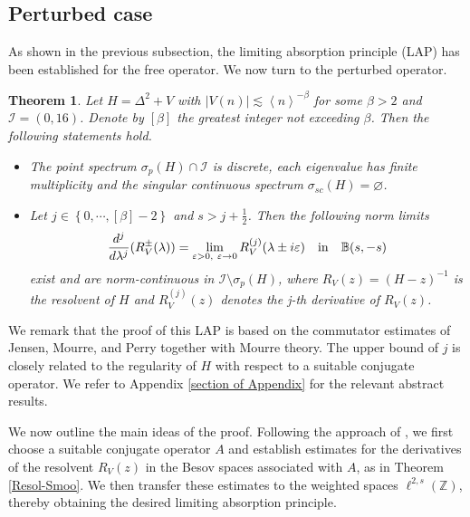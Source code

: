 \documentclass[reqno, 11pt]{amsart}
\newtheorem{theorem}[definition]{Theorem}
\newcommand\Z{\mathbb{Z}}
\newcommand\B{\mathbb{B}}
\newcommand\mcaI{\mathcal{I}}
\numberwithin{equation}{section}
\begin{document}
\subsection{Perturbed case}\label{subsection of asympotic}
As shown in the previous subsection, the limiting absorption principle
(LAP) has been established for the free operator. We now turn to the perturbed operator.
\begin{theorem}\label{LAP-theorem}
{ Let $H=\Delta^2+V$ with $|V(n)|\lesssim \left<n\right>^{-\beta}$ for some $\beta>2$ and $\mcaI=(0,16)$. Denote by $[\beta]$ the greatest integer not exceeding $\beta$. Then the following statements hold.}
\begin{itemize}
\item [\rm(i)] The point spectrum $\sigma_p(H)\cap\mcaI$ is discrete, each eigenvalue has finite multiplicity and the singular continuous spectrum $\sigma_{sc}(H)=\varnothing$.
\vskip0.1cm
\item [\rm(ii)] Let $j\in\left\{0,\cdots,[\beta]-2\right\}$ and $s>j+\frac{1}{2}$. Then the following norm limits
\begin{equation*}
   \frac{d^{j}}{d\lambda^j}(R^{\pm}_V(\lambda))=\lim\limits_{\varepsilon>0,\ \varepsilon\rightarrow0}R^{(j)}_V(\lambda\pm i\varepsilon) \quad {\rm in} \quad \B(s,-s)
    \end{equation*}
exist and are norm-continuous in $\mcaI\setminus\sigma_p(H)$, where $R_{V}(z)=(H-z)^{-1}$ is the resolvent of $H$ and $R^{(j)}_{V}(z)$ denotes the j-th derivative of $R_{V}(z)$.
\end{itemize}
\end{theorem}
We remark that the proof of this LAP is based on the commutator estimates of Jensen, Mourre, and Perry \cite{JMP84} together with Mourre theory. The upper bound of $j$ is closely related to the regularity of $H$ with respect to a suitable conjugate operator. We refer to Appendix \ref{section of Appendix} for the relevant abstract results.

We now outline the main ideas of the proof. Following the approach of \cite{JMP84}, we first choose a suitable conjugate operator $A$ and establish estimates for the derivatives of the resolvent $R_V(z)$ in the Besov spaces associated with $A$, as in Theorem \ref{Resol-Smoo}. We then transfer these estimates to the weighted spaces $\ell^{2,s}(\Z)$, thereby obtaining the desired limiting absorption principle.
\end{document}
